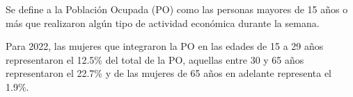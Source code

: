 Se define a la Población Ocupada (PO) como las personas mayores de 15 años o más que realizaron algún tipo de actividad económica durante la semana. 

Para 2022, las mujeres que integraron la PO en las edades de 15 a 29 años representaron el 12.5\% del total de la PO, aquellas entre 30 y 65 años representaron el 22.7\% y de las mujeres de 65 años en adelante representa el 1.9\%.